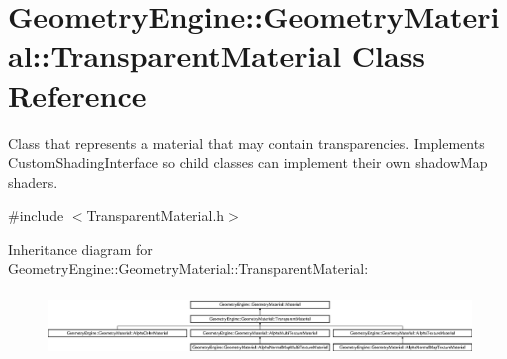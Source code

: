 \hypertarget{class_geometry_engine_1_1_geometry_material_1_1_transparent_material}{}\section{Geometry\+Engine\+::Geometry\+Material\+::Transparent\+Material Class Reference}
\label{class_geometry_engine_1_1_geometry_material_1_1_transparent_material}


Class that represents a material that may contain transparencies. Implements Custom\+Shading\+Interface so child classes can implement their own shadow\+Map shaders.  




{\ttfamily \#include $<$Transparent\+Material.\+h$>$}

Inheritance diagram for Geometry\+Engine\+::Geometry\+Material\+::Transparent\+Material\+:\begin{figure}[H]
\begin{center}
\leavevmode
\includegraphics[height=1.704718cm]{class_geometry_engine_1_1_geometry_material_1_1_transparent_material}
\end{center}
\end{figure}
